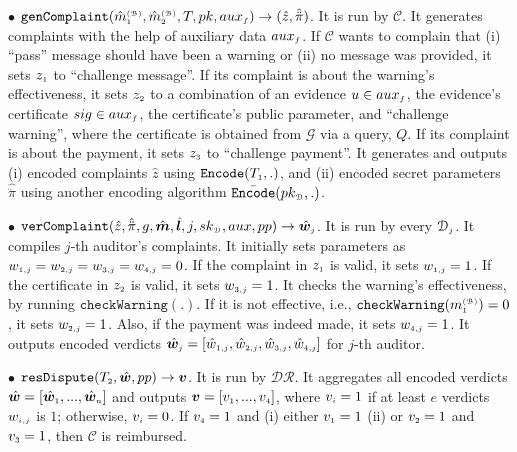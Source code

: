 \begin{definition}
 \item  [$\bullet$] $\mathtt{genComplaint}(\hat m^{\scriptscriptstyle\mathcal{(B)}}_{\scriptscriptstyle 1}, \hat m^{\scriptscriptstyle\mathcal{(B)}}_{\scriptscriptstyle2}, T, pk, {aux}_{\scriptscriptstyle f})\rightarrow (\hat z, \hat{\ddot \pi})$. It is run by $\mathcal{C}$. It generates complaints with the help of auxiliary data ${aux}_{\scriptscriptstyle f}$.  If $\mathcal{C}$ wants to complain that (i)   ``pass'' message should have been a warning or (ii) no message was provided,   it sets $z_{\scriptscriptstyle 1}$ to ``challenge message''. If its complaint is about the warning's effectiveness,  it sets $z_{\scriptscriptstyle 2}$ to a combination of an evidence $u\in aux_{\scriptscriptstyle f}$, the evidence's certificate $sig\in aux_{\scriptscriptstyle f}$, the certificate's public parameter,   and ``challenge warning'', where the certificate is obtained from  $\mathcal{G}$ via a query, $Q$. If its complaint is  about the payment, it sets $z_{\scriptscriptstyle 3}$ to ``challenge payment''. It  generates and outputs (i)  encoded complaints $\hat z$ using  $\mathtt{Encode}(T_{\scriptscriptstyle 1},.)$, and (ii) encoded secret  parameters $\hat{\ddot \pi}$  using another encoding algorithm $\bar{\mathtt{Encode}}(pk_{\scriptscriptstyle \mathcal{D}},.)$.   

\vs

\item  [$\bullet$] $\mathtt{verComplaint}( \hat z, \hat{\ddot{\pi}}, g, \hat{\bm m}, \hat{\bm{l}}, j, sk_{\scriptscriptstyle\mathcal D}, aux, pp)\rightarrow \hat{\bm{w}}_{\scriptscriptstyle j}$. It is run by every $\mathcal{D}_{\scriptscriptstyle  j}$. It compiles $j$-th auditor's complaints. It initially sets parameters as  ${w}_{\scriptscriptstyle 1,j}= {w}_{\scriptscriptstyle 2, j}= {w}_{\scriptscriptstyle 3, j}= {w}_{\scriptscriptstyle 4, j}=0$. If the complaint in $ z_{\scriptscriptstyle 1}$ is valid, it sets  $w_{\scriptscriptstyle 1,j}=1$. If the certificate in $z_{\scriptscriptstyle 2}$ is valid,  it sets $ w_{\scriptscriptstyle 3,j}=1$. It  checks the warning's effectiveness, by running $\mathtt{checkWarning}(.)$. If  it is not effective, i.e., $\mathtt{checkWarning}({m}^{\scriptscriptstyle\mathcal{(B)}}_{\scriptscriptstyle1})= 0$,  it sets  $w_{\scriptscriptstyle 2,j}=1$.  Also, if  the payment was indeed made,    it sets $w_{\scriptscriptstyle 4,j}=1$. It outputs encoded verdicts $\hat{\bm{w}}_{\scriptscriptstyle j}= [\hat {w}_{\scriptscriptstyle 1,j}, \hat{w}_{\scriptscriptstyle 2, j}, \hat{w}_{\scriptscriptstyle 3, j}, \hat{w}_{\scriptscriptstyle 4, j}]$ for $j$-th auditor. %
%

\vs

\item  [$\bullet$] $\mathtt{resDispute}(T_{\scriptscriptstyle2}, \hat{\bm{w}}, pp)\rightarrow {\bm v}$. It is run by $\mathcal {DR}$. It  aggregates all  encoded verdicts $\hat{\bm{w}}=[\hat{\bm{w}}_{\scriptscriptstyle 1},...,\hat{\bm{w}}_{\scriptscriptstyle n}]$ and outputs $\bm{v}=[v_{\scriptscriptstyle 1},..., v_{\scriptscriptstyle 4}]$, where $v_{\scriptscriptstyle i}=1$ if at least $e$   verdicts ${w}_{\scriptscriptstyle i,j}$ is $1$; otherwise, $v_{\scriptscriptstyle i}=0$. If $v_{\scriptscriptstyle 4}=1$ and (i) either $v_{\scriptscriptstyle 1}=1$ (ii) or $v_{\scriptscriptstyle 2}=1$ and $v_{\scriptscriptstyle 3}=1$,  then  $\mathcal C$  is reimbursed.
%
\end{definition}



